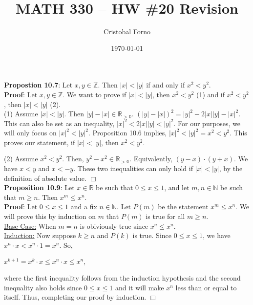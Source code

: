 \documentclass[12pt]{article}
\title{MATH 330 -- HW \#20 Revision}
\author{Cristobal Forno}
\date{\today}
\begin{document}
\maketitle

\noindent
\textbf{Propostion 10.7}: Let $x, y \in \mathbb{Z}$. Then $|x| < |y|$ if and
only if $x^2 < y^2$.\\

\noindent
\textbf{Proof}:
Let $x, y \in \mathbb{Z}$. We want to prove if $|x| < |y|$, then $x^2 < y^2$ (1)
and if $x^2 < y^2$, then $|x| < |y|$ (2).\\
\indent
(1) Assume $|x| < |y|$. Then $|y| - |x| \in \mathbb{R_{> 0}}$.  $(|y| - |x|)^2 =
|y|^2 - 2|x||y| - 
|x|^2$. This can also be set as an inequality, $|x|^2 < 2|x||y| < |y|^2$. For
our purposes, we will only focus on $|x|^2 < |y|^2$. Proposition 10.6 implies, $|x|^2 < |y|^2 = x^2 < y^2$. This proves our statement, if $|x| < |y|$, then $x^2 < y^2$.

\indent
(2) Assume $x^2 < y^2$. Then, $y^2 - x^2 \in \mathbb{R_{> 0}}$. Equivalently,
$(y-x) \cdot (y+x)$. We have $x < y$ and $x < -y$. These two inequalities can
only hold if $|x| < |y|$, by the definition of absolute value. $\Box$ \\

\noindent
\textbf{Proposition 10.9}: Let $x \in \mathbb{R}$ be such that $0 \leq x \leq
1$, and let $m,n \in \mathbb{N}$ be such that $m \geq n$. Then $x^m \leq x^n$.\\

\noindent
\textbf{Proof}:
Let $0 \leq x \leq 1$ and a fix $n \in \mathbb{N}$. Let $P(m)$ be the statement
$x^m \leq x^n$. We will prove this by induction on $m$ that $P(m)$ is true for
all $m \geq n$. \\
\indent
\underline{Base Case:} When $m = n$ is obiviously true since $x^n \leq x^n$.\\
\indent
\underline{Induction:} Now suppose $k \geq n$ and $P(k)$ is true. Since $0 \leq
x \leq 1$, we have $x^n \cdot x < x^n \cdot 1 = x^n$. So,
\begin{center}
  $x^{k+1} = x^k \cdot x \leq x^n \cdot x \leq x^n$,
\end{center}
where the first inequality follows from the induction hypothesis and the second
inequality also holds since $0 \leq
x \leq 1$ and it will make $x^n$ less than or equal to itself. Thus, completing our
proof by induction. $\Box$
\end{document}
